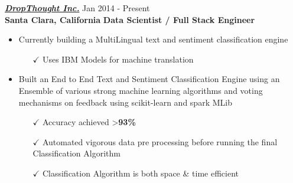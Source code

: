 \vspace{5pt}

{\sl \href{http://www.dropthought.com}{\textbf{DropThought Inc.}}} \hfill        Jan 2014 - Present \\
{\textbf{Santa Clara, California}}       \hfill   \textbf{ Data Scientist / Full Stack Engineer}
 \begin{itemize} \itemsep -2pt %
 \item Currently building a MultiLingual text and sentiment classification engine\itemsep -2pt
   \begin{itemize}
     \item[$\checkmark$]  \itemsep -8pt%
  Uses IBM Models for machine translation \\
      \end{itemize} 
            \end{itemize} 

   \begin{itemize} \itemsep -2pt %
 \item Built an End to End Text and Sentiment Classification Engine using an Ensemble of various strong machine learning algorithms and voting mechanisms on feedback using scikit-learn and spark MLib \itemsep -2pt
   \begin{itemize}
     \item[$\checkmark$]  \itemsep -8pt%
   Accuracy achieved  \textgreater {\bf93\%}\\
     \item[$\checkmark$]  \itemsep -8pt%
  Automated vigorous data pre processing before running the final Classification Algorithm\\
        \item[$\checkmark$]  \itemsep -8pt%
   Classification Algorithm is both space \& time efficient\\
      \end{itemize} 
            \end{itemize} 

